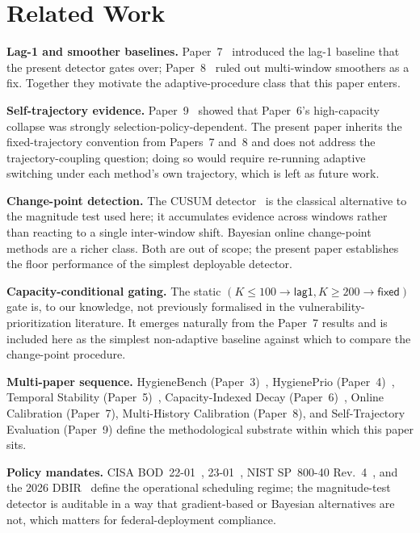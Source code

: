 \section{Related Work}

\textbf{Lag-1 and smoother baselines.} Paper~7~\cite{paper7online}
introduced the lag-1 baseline that the present detector gates over;
Paper~8~\cite{paper8multi} ruled out multi-window smoothers as a
fix. Together they motivate the adaptive-procedure class that this
paper enters.

\textbf{Self-trajectory evidence.} Paper~9~\cite{paper9selftraj}
showed that Paper~6's high-capacity collapse was strongly
selection-policy-dependent. The present paper inherits the
fixed-trajectory convention from Papers~7 and~8 and does not address
the trajectory-coupling question; doing so would require
re-running adaptive switching under each method's own trajectory,
which is left as future work.

\textbf{Change-point detection.}
The CUSUM detector~\cite{page1954cusum} is the classical alternative
to the magnitude test used here; it accumulates evidence across
windows rather than reacting to a single inter-window shift.
Bayesian online change-point methods are a richer class. Both are
out of scope; the present paper establishes the floor performance
of the simplest deployable detector.

\textbf{Capacity-conditional gating.} The static
$(K \leq 100 \to \textsf{lag1}, K \geq 200 \to \textsf{fixed})$
gate is, to our knowledge, not previously formalised in the
vulnerability-prioritization literature. It emerges naturally from
the Paper~7 results and is included here as the simplest non-adaptive
baseline against which to compare the change-point procedure.

\textbf{Multi-paper sequence.} HygieneBench (Paper~3)~\cite{paper3hygienebench},
HygienePrio (Paper~4)~\cite{paper4hygieneprio}, Temporal Stability
(Paper~5)~\cite{paper5temporal}, Capacity-Indexed Decay
(Paper~6)~\cite{paper6capacity}, Online Calibration (Paper~7),
Multi-History Calibration (Paper~8), and Self-Trajectory
Evaluation (Paper~9) define the methodological substrate within
which this paper sits.

\textbf{Policy mandates.} CISA BOD~22-01~\cite{cisa2021bod2201},
23-01~\cite{cisa2022bod2301}, NIST SP~800-40
Rev.~4~\cite{nist2022sp80040r4}, and the 2026 DBIR~\cite{verizon2026dbir}
define the operational scheduling regime; the magnitude-test detector
is auditable in a way that gradient-based or Bayesian alternatives
are not, which matters for federal-deployment compliance.
